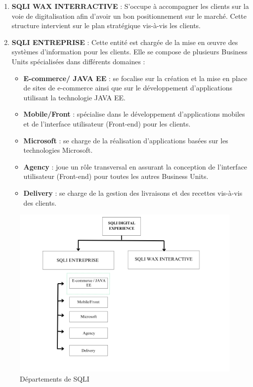 \begin{enumerate}
    \item \textbf{SQLI WAX INTERRACTIVE} : S’occupe à accompagner les clients sur la voie de digitalisation afin d’avoir un bon positionnement sur le marché. Cette structure
     intervient sur le plan stratégique vis-à-vis les clients.
     \item \textbf{SQLI ENTREPRISE} : Cette entité est chargée de la mise en œuvre des systèmes d'information pour les clients. Elle se compose de plusieurs Business Units spécialisées dans différents domaines :
\begin{itemize}

    \item \textbf{E-commerce/ JAVA EE} : se focalise sur la création et la mise en place de sites de e-commerce ainsi que sur le développement d'applications utilisant la technologie JAVA EE.
    \item \textbf{Mobile/Front} : spécialise dans le développement d'applications mobiles et de l'interface utilisateur (Front-end) pour les clients.
     \item \textbf{Microsoft} : se charge de la réalisation d'applications basées sur les technologies Microsoft.
      \item \textbf{Agency} : joue un rôle transversal en assurant la conception de l'interface utilisateur (Front-end) pour toutes les autres Business Units.
        \item \textbf{Delivery} : se charge de la gestion des livraisons et des recettes vis-à-vis des clients.       
\end{itemize}
\end{enumerate}
\vspace{0.5cm}
\begin{figure}[H]  
  \centering  
  \includegraphics[width=14cm]{Figures/departement.png}
  \caption{Départements de SQLI}
  \label{Over The Air updates}
\end{figure}


